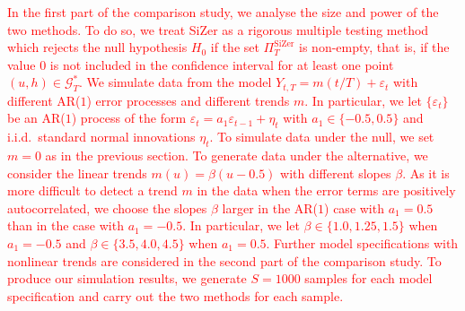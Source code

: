 \textcolor{red}{
In the first part of the comparison study, we analyse the size and power of the two methods. To do so, we treat SiZer as a rigorous multiple testing method which rejects the null hypothesis $H_0$ if the set $\Pi_T^{\text{SiZer}}$ is non-empty, that is, if the value $0$ is not included in the confidence interval for at least one point $(u,h) \in \mathcal{G}_T^*$. We simulate data from the model $Y_{t,T} = m(t/T) + \varepsilon_t$ with different AR($1$) error processes and different trends $m$. In particular, we let $\{\varepsilon_t\}$ be an AR($1$) process of the form $\varepsilon_t = a_1 \varepsilon_{t-1} + \eta_t$ with $a_1 \in \{ -0.5,0.5\}$ and i.i.d.\ standard normal innovations $\eta_t$. To simulate data under the null, we set $m = 0$ as in the previous section. To generate data under the alternative, we consider the linear trends $m(u) = \beta (u - 0.5)$ with different slopes $\beta$. As it is more difficult to detect a trend $m$ in the data when the error terms are positively autocorrelated, we choose the slopes $\beta$ larger in the AR($1$) case with $a_1 = 0.5$ than in the case with $a_1 = -0.5$. In particular, we let $\beta \in \{ 1.0,1.25,1.5 \}$ when $a_1 = -0.5$ and $\beta \in \{ 3.5,4.0,4.5 \}$ when $a_1 = 0.5$. Further model specifications with nonlinear trends are considered in the second part of the comparison study. To produce our simulation results, we generate $S=1000$ samples for each model specification and carry out the two methods for each sample.} 


